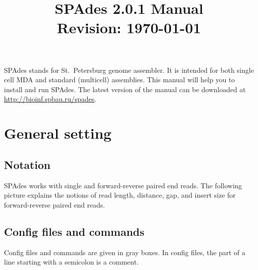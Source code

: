 \documentclass{article}
\def\spades{SPAdes}
\begin{document}
\sloppy

\title{{\spades} 2.0.1 Manual\\{\small 
  Revision: \today}}
\date{}
\maketitle

{\spades} stands for St.~Petersburg genome assembler.
It is intended for both single cell MDA and standard (multicell) 
assemblies. 
This manual will help you to install and run
{\spades}. The latest version of the manual can be downloaded at \url{http://bioinf.spbau.ru/spades}.


\renewcommand{\contentsname}{}
\tableofcontents



\pagebreak

\section{General setting}
\subsection{Notation}
{\spades} works with single and forward-reverse paired end reads.
The following picture explains the notions of 
read length, distance, gap, and insert size
for forward-reverse paired end reads.

\begin{center}
\end{center}

\subsection{Config files and commands}
Config files and commands are given in gray boxes. 
In config files, the part of a line starting with a semicolon is a comment.
\end{document}
